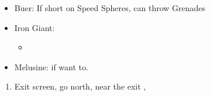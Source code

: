 \begin{encounters}
	\begin{itemize}
		\item Buer: If short on Speed Spheres, can throw Grenades
		\item Iron Giant:
		      \begin{itemize}
			      \switch{\tidus}{\rikku}
			      \rikkuf \steal{} \lightcurtain{}
			      \switch{\wakka}{\tidus}
			      \tidusf Defend
			      \enemyf Attacks \rikku
			      \auronf Defend
			      \item \flee{}
		      \end{itemize}
		\item Melusine: \steal{} \petrifygrenade{} if want to.
	\end{itemize}
\end{encounters}
\begin{enumerate}[resume]
	\item Exit screen, go north, near the exit \sd, \cs[3:10]
\end{enumerate}